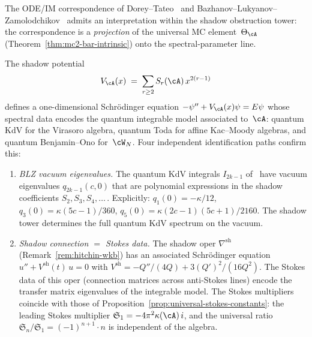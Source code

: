 \begin{remark}%
\label{rem:ode-im-shadow-identification}%
\ClaimStatusConditional%
%
%
%
%
%
%
The ODE/IM correspondence of Dorey--Tateo~\cite{DT99} and
Bazhanov--Lukyanov--Zamolodchikov~\cite{BLZ99} admits an
interpretation within the shadow obstruction tower:
the correspondence is a \emph{projection} of the universal
MC element~$\Theta_{\cA}$
(Theorem~\ref{thm:mc2-bar-intrinsic}) onto the
spectral-parameter line.

The shadow potential
\begin{equation}\label{eq:shadow-potential-ode-im}
 V_{\cA}(x)
 \;=\;
 \sum_{r \geq 2} S_r(\cA)\,x^{2(r-1)}
\end{equation}
defines a one-dimensional Schr\"odinger equation
$-\psi'' + V_{\cA}(x)\psi = E\psi$ whose spectral data
encodes the quantum integrable model associated to~$\cA$:
quantum KdV for the Virasoro algebra, quantum
Toda for affine Kac--Moody algebras, and quantum
Benjamin--Ono for~$\cW_N$. Four independent
identification paths confirm this:
\begin{enumerate}[label=\textup{(\roman*)}]
\item \emph{BLZ vacuum eigenvalues.}\enspace
 The quantum KdV integrals
 $I_{2k-1}$ of~\cite{BLZ99} have vacuum eigenvalues
 $q_{2k-1}(c, 0)$ that are polynomial expressions
 in the shadow coefficients $S_2, S_3, S_4, \ldots$\,.
 Explicitly:
 $q_1(0) = -\kappa/12$,
 $q_3(0) = \kappa(5c{-}1)/360$,
 $q_5(0) = \kappa(2c{-}1)(5c{+}1)/2160$.
 The shadow tower determines the full quantum KdV
 spectrum on the vacuum.
\item \emph{Shadow connection $=$ Stokes data.}\enspace
 The shadow oper $\nabla^{\mathrm{sh}}$
 (Remark~\ref{rem:hitchin-wkb}) has an associated
 Schr\"odinger equation
 $u'' + V^{\mathrm{sh}}(t)\,u = 0$ with
 $V^{\mathrm{sh}} =
 -Q''/(4Q) + 3(Q')^2/(16Q^2)$.
 The Stokes data of this oper (connection matrices
 across anti-Stokes lines) encode the transfer matrix
 eigenvalues of the integrable model. The Stokes
 multipliers coincide with those of
 Proposition~\ref{prop:universal-stokes-constants}:
 the leading Stokes multiplier
 $\mathfrak{S}_1 = -4\pi^2\kappa(\cA)\,i$, and the
 universal ratio $\mathfrak{S}_n/\mathfrak{S}_1
 = (-1)^{n+1}\cdot n$ is independent of the algebra.

\end{enumerate}
\end{remark}
